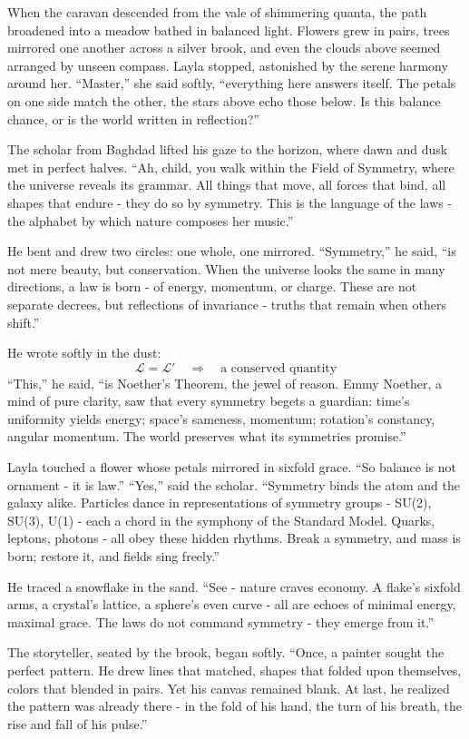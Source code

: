 \documentclass[
  letterpaper,
  DIV=11,
  numbers=noendperiod]{scrreprt}
\begin{document}
When the caravan descended from the vale of shimmering quanta, the path
broadened into a meadow bathed in balanced light. Flowers grew in pairs,
trees mirrored one another across a silver brook, and even the clouds
above seemed arranged by unseen compass. Layla stopped, astonished by
the serene harmony around her. ``Master,'' she said softly, ``everything
here answers itself. The petals on one side match the other, the stars
above echo those below. Is this balance chance, or is the world written
in reflection?''

The scholar from Baghdad lifted his gaze to the horizon, where dawn and
dusk met in perfect halves. ``Ah, child, you walk within the Field of
Symmetry, where the universe reveals its grammar. All things that move,
all forces that bind, all shapes that endure - they do so by symmetry.
This is the language of the laws - the alphabet by which nature composes
her music.''

He bent and drew two circles: one whole, one mirrored. ``Symmetry,'' he
said, ``is not mere beauty, but conservation. When the universe looks
the same in many directions, a law is born - of energy, momentum, or
charge. These are not separate decrees, but reflections of invariance -
truths that remain when others shift.''

He wrote softly in the dust: \[
\mathcal{L} = \mathcal{L}' \quad \Rightarrow \quad \text{a conserved quantity}
\] ``This,'' he said, ``is Noether's Theorem, the jewel of reason. Emmy
Noether, a mind of pure clarity, saw that every symmetry begets a
guardian: time's uniformity yields energy; space's sameness, momentum;
rotation's constancy, angular momentum. The world preserves what its
symmetries promise.''

Layla touched a flower whose petals mirrored in sixfold grace. ``So
balance is not ornament - it is law.'' ``Yes,'' said the scholar.
``Symmetry binds the atom and the galaxy alike. Particles dance in
representations of symmetry groups - SU(2), SU(3), U(1) - each a chord
in the symphony of the Standard Model. Quarks, leptons, photons - all
obey these hidden rhythms. Break a symmetry, and mass is born; restore
it, and fields sing freely.''

He traced a snowflake in the sand. ``See - nature craves economy. A
flake's sixfold arms, a crystal's lattice, a sphere's even curve - all
are echoes of minimal energy, maximal grace. The laws do not command
symmetry - they emerge from it.''

The storyteller, seated by the brook, began softly. ``Once, a painter
sought the perfect pattern. He drew lines that matched, shapes that
folded upon themselves, colors that blended in pairs. Yet his canvas
remained blank. At last, he realized the pattern was already there - in
the fold of his hand, the turn of his breath, the rise and fall of his
pulse.''
\end{document}
